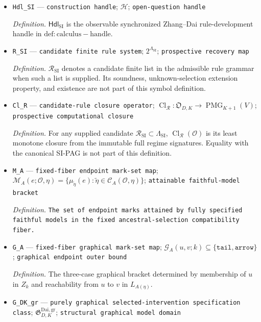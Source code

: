 \documentclass{article}
\begin{document}
\begin{itemize}
  \item \texttt{Hdl\_\allowbreak{}SI} --- \texttt{construction handle}; \(\mathcal H\); \texttt{open-\allowbreak{}question handle}
  \par\smallskip\noindent\emph{Definition.} \(\mathsf{Hdl}_{\mathrm{SI}}\) is the observable synchronized Zhang--Dai rule-development handle in \(\mathrm{def:calculus-handle}\).
  \item \texttt{R\_\allowbreak{}SI} --- \texttt{candidate finite rule system}; \(2^{\Lambda_{\mathrm{SI}}}\); \texttt{prospective recovery map}
  \par\smallskip\noindent\emph{Definition.} \(\mathcal R_{\mathrm{SI}}\) denotes a candidate finite list in the admissible rule grammar when such a list is supplied. Its soundness, unknown-selection extension property, and existence are not part of this symbol definition.
  \item \texttt{Cl\_\allowbreak{}R} --- \texttt{candidate-\allowbreak{}rule closure operator}; \(\operatorname{Cl}_{\mathcal R}:\mathfrak O_{D,K}\to\operatorname{PMG}_{K+1}(V)\); \texttt{prospective computational closure}
  \par\smallskip\noindent\emph{Definition.} For any supplied candidate \(\mathcal R_{\mathrm{SI}}\subset\Lambda_{\mathrm{SI}}\), \(\operatorname{Cl}_{\mathcal R}(\mathcal O)\) is its least monotone closure from the immutable full regime signatures. Equality with the canonical SI-PAG is not part of this definition.
  \item \texttt{M\_\allowbreak{}A} --- \texttt{fixed-\allowbreak{}fiber endpoint mark-\allowbreak{}set map}; \(\mathcal M_A(e;\mathcal O,\eta)=\{\mu_{\widetilde\eta}(e):\widetilde\eta\in\mathcal C_A(\mathcal O,\eta)\}\); \texttt{attainable faithful-\allowbreak{}model bracket}
  \par\smallskip\noindent\emph{Definition.} \texttt{The set of endpoint marks attained by fully specified faithful models in the fixed ancestral-\allowbreak{}selection compatibility fiber.}
  \item \texttt{G\_\allowbreak{}A} --- \texttt{fixed-\allowbreak{}fiber graphical mark-\allowbreak{}set map}; \(\mathcal G_A(u,v;k)\subseteq\{\mathtt{tail},\mathtt{arrow}\}\); \texttt{graphical endpoint outer bound}
  \par\smallskip\noindent\emph{Definition.} The three-case graphical bracket determined by membership of \(u\) in \(Z_k\) and reachability from \(u\) to \(v\) in \(L_{A(\eta)}\).
  \item \texttt{G\_\allowbreak{}DK\_\allowbreak{}gr} --- \texttt{purely graphical selected-\allowbreak{}intervention specification class}; \(\mathfrak G_{D,K}^{\mathrm{Dai,gr}}\); \texttt{structural graphical model domain}

\end{itemize}
\end{document}
